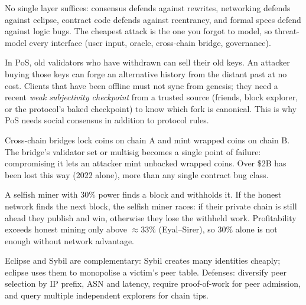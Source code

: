 \begin{remark}\label{rem:defense}
No single layer suffices: consensus defends against rewrites, networking defends against eclipse, contract code defends against reentrancy, and formal specs defend against logic bugs. The cheapest attack is the one you forgot to model, so threat-model every interface (user input, oracle, cross-chain bridge, governance).
\end{remark}

\begin{example}\label{ex:long-range}
In PoS, old validators who have withdrawn can sell their old keys. An attacker buying those keys can forge an alternative history from the distant past at no cost. Clients that have been offline must not sync from genesis; they need a recent \emph{weak subjectivity checkpoint} from a trusted source (friends, block explorer, or the protocol's baked checkpoint) to know which fork is canonical. This is why PoS needs social consensus in addition to protocol rules.
\end{example}

\begin{remark}\label{rem:bridge}
Cross-chain bridges lock coins on chain A and mint wrapped coins on chain B. The bridge's validator set or multisig becomes a single point of failure: compromising it lets an attacker mint unbacked wrapped coins. Over \$2B has been lost this way (2022 alone), more than any single contract bug class.
\end{remark}

\begin{example}\label{ex:selfish}
A selfish miner with 30\% power finds a block and withholds it. If the honest network finds the next block, the selfish miner races: if their private chain is still ahead they publish and win, otherwise they lose the withheld work. Profitability exceeds honest mining only above $\approx33\%$ (Eyal--Sirer), so 30\% alone is not enough without network advantage.
\end{example}

\begin{remark}\label{rem:eclipse}
Eclipse and Sybil are complementary: Sybil creates many identities cheaply; eclipse uses them to monopolise a victim's peer table. Defenses: diversify peer selection by IP prefix, ASN and latency, require proof-of-work for peer admission, and query multiple independent explorers for chain tips.
\end{remark}

